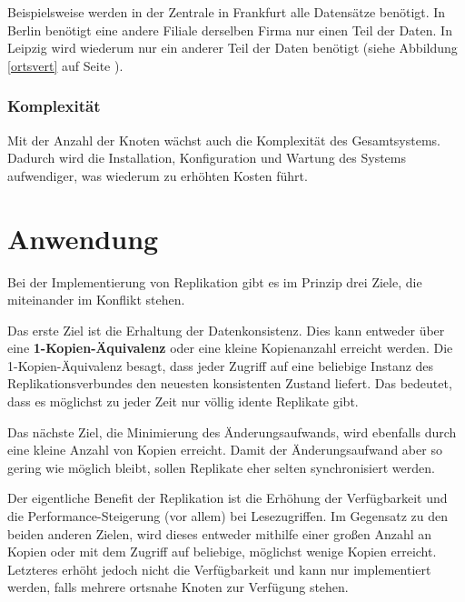 Beispielsweise werden in der Zentrale in Frankfurt alle Datensätze benötigt. In Berlin benötigt eine andere Filiale derselben Firma nur einen Teil der Daten. In Leipzig wird wiederum nur ein anderer Teil der Daten benötigt (siehe Abbildung \ref{ortsvert} auf Seite \pageref{ortsvert}).

\subsubsection{Komplexität}

Mit der Anzahl der Knoten wächst auch die Komplexität des Gesamtsystems. Dadurch wird die Installation, Konfiguration und Wartung des Systems aufwendiger, was wiederum zu erhöhten Kosten führt.
\clearpage
\section{Anwendung}

Bei der Implementierung von Replikation gibt es im Prinzip drei Ziele, die miteinander im Konflikt stehen.

Das erste Ziel ist die Erhaltung der Datenkonsistenz. Dies kann entweder über eine \textbf{1-Kopien-Äquivalenz} \label{aequivalenz} oder eine kleine Kopienanzahl erreicht werden. Die 1-Kopien-Äquivalenz besagt, dass jeder Zugriff auf eine beliebige Instanz des Replikationsverbundes den neuesten konsistenten Zustand liefert. \cite{leipzig2} Das bedeutet, dass es möglichst zu jeder Zeit nur völlig idente Replikate gibt.

Das nächste Ziel, die Minimierung des Änderungsaufwands, wird ebenfalls durch eine kleine Anzahl von Kopien erreicht. Damit der Änderungsaufwand aber so gering wie möglich bleibt, sollen Replikate eher selten synchronisiert werden. \cite{leipzig2}

Der eigentliche Benefit der Replikation ist die Erhöhung der Verfügbarkeit und die Performance-Steigerung (vor allem) bei Lesezugriffen. Im Gegensatz zu den beiden anderen Zielen, wird dieses entweder mithilfe einer großen Anzahl an Kopien oder mit dem Zugriff auf beliebige, möglichst wenige Kopien erreicht. \cite{leipzig2} Letzteres erhöht jedoch nicht die Verfügbarkeit und kann nur implementiert werden, falls mehrere ortsnahe Knoten zur Verfügung stehen.

